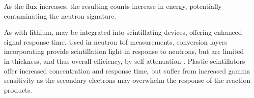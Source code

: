\documentclass[../../../../main.tex]{subfiles}%
\begin{document}
    As the flux increases, the resulting counts increase in energy, potentially contaminating the neutron signature.
    \par%
    As with lithium,  may be integrated into scintillating devices, offering enhanced signal response time.
    Used in neutron \gls{tof} measurements, conversion layers incorporating  provide scintillation light in response to neutrons, but are limited in thickness, and thus overall efficiency, by self attenuation \cite{book:Knoll_2010}.
    Plastic scintillators offer increased  concentration and response time, but suffer from increased gamma sensitivity as the secondary electrons may overwhelm the response of the reaction products.
\end{document}
